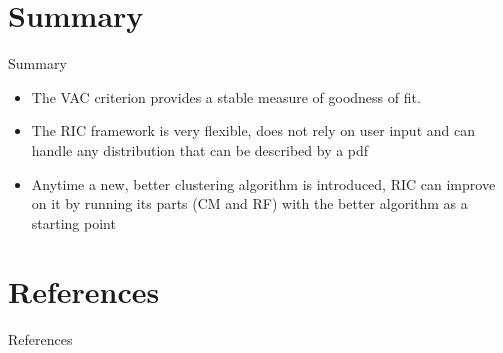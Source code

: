 \documentclass{beamer}
\begin{document}
  \note{}
  
  \section{Summary}
  
  \begin{frame}{Summary}
    \begin{itemize}
      \item The VAC criterion provides a \alert{stable measure of goodness of fit}.
      \item The RIC framework is very flexible, does not rely on user input and can handle any distribution that can be described by a pdf
      \item Anytime a new, better clustering algorithm is introduced, RIC can improve on it by running its parts (CM and RF) with the better algorithm as a starting point\\
    \end{itemize}
  \end{frame}
  
  
  \section{References}
  
  \begin{frame}[t]{References}
    
  \end{frame}
  
\end{document}
